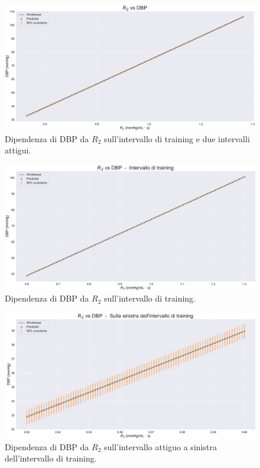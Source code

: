 \vspace{1cm}

\begin{figure}[!htb]
    \centering
    \includegraphics[width=1\textwidth]{images/Training (risultati)/DBP/DBP - R2 - full.pdf}
    \caption{Dipendenza di DBP da $R_2$ sull'intervallo di training e due intervalli attigui.}
    \label{DBP - R2 - full}
\end{figure}

\vspace{0.34cm}

\begin{figure}[!htb]
    \centering
    \includegraphics[width=1\textwidth]{images/Training (risultati)/DBP/DBP - R2 - training.pdf}
    \caption{Dipendenza di DBP da $R_2$ sull'intervallo di training.}
    \label{DBP - R2 - training}
\end{figure}

\begin{figure}
    \centering
    \includegraphics[width=1\textwidth]{images/Training (risultati)/DBP/DBP - R2 - sx.pdf}
    \caption{Dipendenza di DBP da $R_2$ sull'intervallo attiguo a sinistra dell'intervallo di training.}
    \label{DBP - R2 - sx}
\end{figure}


